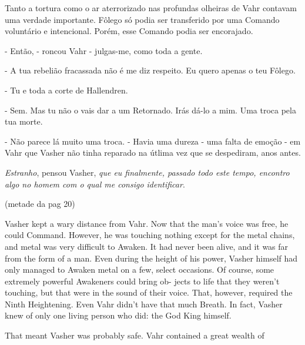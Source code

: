 \documentclass[11pt,a4paper]{book}
\begin{document}
 Tanto a tortura como o ar aterrorizado nas profundas olheiras de Vahr contavam uma verdade importante. Fôlego só podia ser transferido por uma Comando voluntário e intencional. Porém, esse Comando podia ser encorajado.
 
 - Então, - roncou Vahr - julgas-me, como toda a gente.
 
 - A tua rebelião fracassada não é me diz respeito. Eu quero apenas o teu Fôlego.
 
 - Tu e toda a corte de Hallendren.
 
 - Sem. Mas tu não o vais dar a um Retornado. Irás dá-lo a mim. Uma troca pela tua morte.
 
 - Não parece lá muito uma troca. - Havia uma dureza - uma falta de emoção - em Vahr que Vasher não tinha reparado na útlima vez que se despediram, anos antes. 
 
 \textit{Estranho}, pensou Vasher, \textit{que eu finalmente, passado todo este tempo, encontro algo no homem com o qual me consigo identificar}.
 

(metade da pag 20)

Vasher kept a wary distance from Vahr. Now that the man’s voice was free, he could Command. However, he was touching nothing except for the metal chains, and metal was very difficult to Awaken. It had never been alive, and it was far from the form of a man. Even during the height of his power, Vasher himself had only managed to Awaken metal on a few, select occasions. Of course, some extremely powerful Awakeners could bring ob- jects to life that they weren’t touching, but that were in the sound of their voice. That, however, required the Ninth Heightening. Even Vahr didn’t have that much Breath. In fact, Vasher knew of only one living person who did: the God King himself.

That meant Vasher was probably safe. Vahr contained a great wealth of
\end{document}
